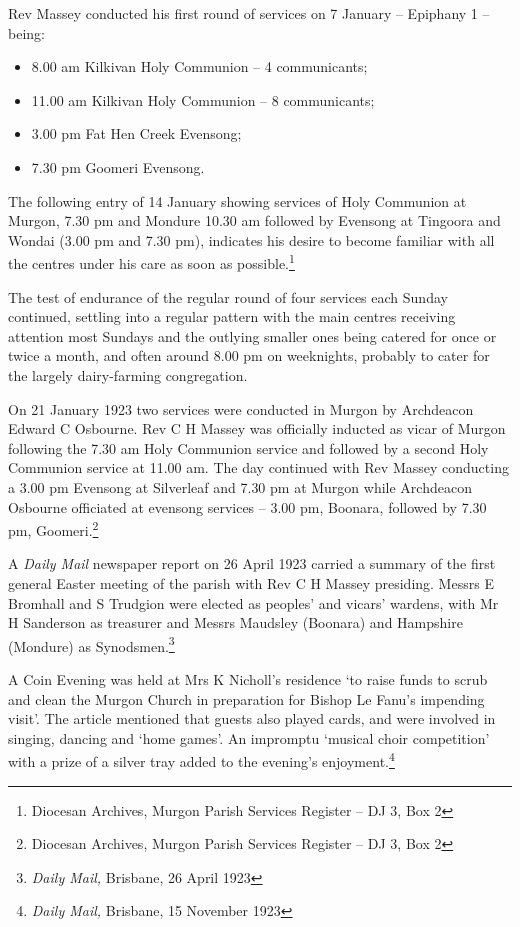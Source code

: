 Rev Massey conducted his first round of services on 7 January -- Epiphany 1 -- being:

\begin{itemize}
\item
  8.00 am Kilkivan Holy Communion -- 4 communicants;
\item
  11.00 am Kilkivan Holy Communion -- 8 communicants;
\item
  3.00 pm Fat Hen Creek Evensong;
\item
  7.30 pm Goomeri Evensong.
\end{itemize}

The following entry of 14 January showing services of Holy Communion at Murgon, 7.30 pm and Mondure 10.30 am followed by Evensong at Tingoora and Wondai (3.00 pm and 7.30 pm), indicates his desire to become familiar with all the centres under his care as soon as possible.\footnote{Diocesan Archives, Murgon Parish Services Register -- DJ 3, Box 2}

The test of endurance of the regular round of four services each Sunday continued, settling into a regular pattern with the main centres receiving attention most Sundays and the outlying smaller ones being catered for once or twice a month, and often around 8.00 pm on weeknights, probably to cater for the largely dairy-farming congregation.

On 21 January 1923 two services were conducted in Murgon by Archdeacon Edward C Osbourne. Rev C H Massey was officially inducted as vicar of Murgon following the 7.30 am Holy Communion service and followed by a second Holy Communion service at 11.00 am. The day continued with Rev Massey conducting a 3.00 pm Evensong at Silverleaf and 7.30 pm at Murgon while Archdeacon Osbourne officiated at evensong services -- 3.00 pm, Boonara, followed by 7.30 pm, Goomeri.\footnote{Diocesan Archives, Murgon Parish Services Register -- DJ 3, Box 2}

A \emph{Daily Mail} newspaper report on 26 April 1923 carried a summary of the first general Easter meeting of the parish with Rev C H Massey presiding. Messrs E Bromhall and S Trudgion were elected as peoples' and vicars' wardens, with Mr H Sanderson as treasurer and Messrs Maudsley (Boonara) and Hampshire (Mondure) as Synodsmen.\footnote{\emph{Daily Mail,} Brisbane, 26 April 1923}

A Coin Evening was held at Mrs K Nicholl's residence `to raise funds to scrub and clean the Murgon Church in preparation for Bishop Le Fanu's impending visit'. The article mentioned that guests also played cards, and were involved in singing, dancing and `home games'. An impromptu `musical choir competition' with a prize of a silver tray added to the evening's enjoyment.\footnote{\emph{Daily Mail,} Brisbane, 15 November 1923}

